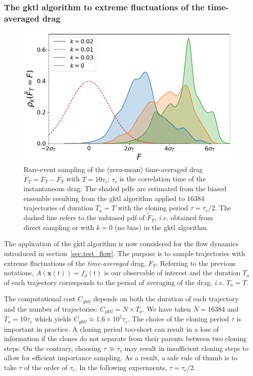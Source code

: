 \documentclass{jfm}
\begin{document}
\subsubsection{The \ac{gktl} algorithm to extreme fluctuations of the time-averaged drag}
\label{sec:gktl_drag}

\begin{figure}
  \centering
  \includegraphics[width=0.7\linewidth]{IS_GKTL/IS_GKTL}
  \caption{\label{fig:IS_GKTL} Rare-event sampling of the (zero-mean) time-averaged drag $\tilde F_T = F_T - \overline{F_T}$ with $T=10\tau_c$; $\tau_c$ is the correlation time of the instantaneous drag. The shaded \ac{pdf}s are estimated from the biased ensemble resulting from the \ac{gktl} algorithm applied to $16384$ trajectories of duration $T_a=T$ with the cloning period $\tau=\tau_c/2$.
    The dashed line refers to the unbiased \ac{pdf} of $\tilde F_T$, \textit{i.e.} obtained from direct sampling or with $k=0$ (no bias) in the \ac{gktl} algorithm.
  }
\end{figure}

The application of the \ac{gktl} algorithm is now considered for the flow dynamics introduced in section~\ref{sec:test_flow}. The purpose is to sample trajectories with extreme fluctuations of the \textit{time-averaged} drag, $F_T$. {Referring to the previous notations, $A(\mathbf{x}(t))=f_d(t)$ is our observable of interest and the duration $T_a$ of each trajectory corresponds to the period of averaging of the drag, \emph{i.e.} $T_a=T$.}

The computational cost $C_{{gktl}}$ depends on both the duration of each trajectory and the number of trajectories: $C_{gktl} = N \times T_a$.
We have taken $N=16384$ and $T_a = 10\tau_c$ which yields $C_{gktl} \approx 1.6 \times 10^5 \tau_c$. The choice of the cloning period $\tau$ is important in practice.
A  cloning period too-short can result in a loss of information if the clones do not separate from their parents between two cloning steps. On the contrary, choosing $\tau \gg \tau_c$ may result in insufficient cloning steps to allow for efficient importance sampling.
As a result, a safe rule of thumb is to take $\tau$ of the order of $\tau_c$.
In the following experiments, $\tau = \tau_c /2$.
% 
\end{document}
